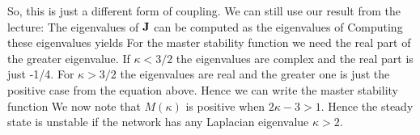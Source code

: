 So, this is just a different form of coupling. We can still use our result from the lecture: The eigenvalues of $\bf J$ can be computed as the eigenvalues of  
Computing these eigenvalues yields 
For the master stability function we need the real part of the greater eigenvalue. If $\kappa<3/2$ the eigenvalues are complex and the real part is just -1/4. For $\kappa>3/2$ the eigenvalues are real and the greater one is just the positive case from the equation above. Hence we can write the master stability function
We now note that $M(\kappa)$ is positive when $2\kappa-3>1$. Hence the steady state is unstable if the network has any Laplacian eigenvalue $\kappa>2$. 
